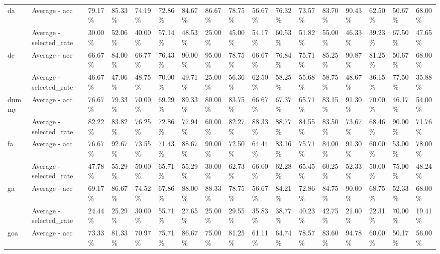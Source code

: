 \begin{table}
\begin{adjustbox}{width=\linewidth}
\begin{tabular}{lllllllllllllllll}
            da        & Average - acc            & 79.17\%       & 85.33\%     & 74.19\%  & 72.86\% & 84.67\%    & 86.67\% & 78.75\%    & 56.67\% & 76.32\%      & 73.57\%      & 83.70\%      & 90.43\% & 62.50\% & 50.67\% & 68.00\%\tabularnewline
                      & Average - selected\_rate & 30.00\%       & 52.06\%     & 40.00\%  & 57.14\% & 48.53\%    & 25.00\% & 45.00\%    & 54.17\% & 60.53\%      & 51.82\%      & 55.00\%      & 46.33\% & 39.23\% & 67.50\% & 47.65\%\tabularnewline
            de        & Average - acc            & 66.67\%       & 84.00\%     & 66.77\%  & 76.43\% & 90.00\%    & 95.00\% & 78.75\%    & 66.67\% & 76.84\%      & 75.71\%      & 85.25\%      & 90.87\% & 81.25\% & 50.67\% & 68.00\%\tabularnewline
                      & Average - selected\_rate & 46.67\%       & 47.06\%     & 48.75\%  & 70.00\% & 49.71\%    & 25.00\% & 56.36\%    & 62.50\% & 58.25\%      & 55.68\%      & 58.75\%      & 48.67\% & 36.15\% & 77.50\% & 35.88\%\tabularnewline
            dummy     & Average - acc            & 76.67\%       & 79.33\%     & 70.00\%  & 69.29\% & 89.33\%    & 80.00\% & 83.75\%    & 66.67\% & 67.37\%      & 65.71\%      & 83.15\%      & 91.30\% & 70.00\% & 46.17\% & 54.00\%\tabularnewline
                      & Average - selected\_rate & 82.22\%       & 83.82\%     & 76.25\%  & 72.86\% & 77.94\%    & 60.00\% & 82.27\%    & 88.33\% & 88.77\%      & 84.55\%      & 83.50\%      & 73.67\% & 68.46\% & 90.00\% & 71.76\%\tabularnewline
            fa        & Average - acc            & 76.67\%       & 92.67\%     & 73.55\%  & 71.43\% & 88.67\%    & 90.00\% & 72.50\%    & 64.44\% & 83.16\%      & 75.71\%      & 84.00\%      & 91.30\% & 60.00\% & 53.00\% & 78.00\%\tabularnewline
                      & Average - selected\_rate & 47.78\%       & 55.29\%     & 50.00\%  & 65.71\% & 55.29\%    & 30.00\% & 62.73\%    & 66.00\% & 62.28\%      & 65.45\%      & 60.25\%      & 52.33\% & 50.00\% & 75.00\% & 48.24\%\tabularnewline
            ga        & Average - acc            & 69.17\%       & 86.67\%     & 74.52\%  & 67.86\% & 88.00\%    & 88.33\% & 78.75\%    & 56.67\% & 84.21\%      & 72.86\%      & 84.75\%      & 90.00\% & 68.75\% & 52.33\% & 68.00\%\tabularnewline
                      & Average - selected\_rate & 24.44\%       & 25.29\%     & 30.00\%  & 55.71\% & 27.65\%    & 25.00\% & 29.55\%    & 35.83\% & 38.77\%      & 40.23\%      & 42.75\%      & 21.00\% & 22.31\% & 70.00\% & 19.41\%\tabularnewline
            goa       & Average - acc            & 73.33\%       & 81.33\%     & 70.97\%  & 75.71\% & 86.67\%    & 75.00\% & 81.25\%    & 61.11\% & 64.74\%      & 78.57\%      & 83.60\%      & 94.78\% & 60.00\% & 50.17\% & 56.00\%\tabularnewline

\end{tabular}
\end{adjustbox}
\end{table}
